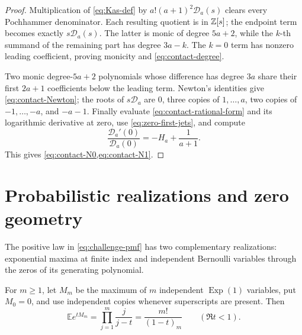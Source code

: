 \begin{proof}
Multiplication of \eqref{eq:Kas-def} by
\(a!(a+1)^2\mathscr D_a(s)\) clears every Pochhammer denominator.  Each
resulting quotient is in \(\mathbb Z[s]\); the endpoint term becomes exactly
\(s\mathscr D_a(s)\).  The latter is monic of degree \(5a+2\), while the
\(k\)-th summand of the remaining part has degree \(3a-k\).  The \(k=0\)
term has nonzero leading coefficient, proving monicity and
\eqref{eq:contact-degree}.

Two monic degree-\(5a+2\) polynomials whose difference has degree \(3a\)
share their first \(2a+1\) coefficients below the leading term.  Newton's
identities give \eqref{eq:contact-Newton}; the roots of
\(s\mathscr D_a\) are \(0\), three copies of \(1,\ldots,a\), two copies of
\(-1,\ldots,-a\), and \(-a-1\).  Finally evaluate
\eqref{eq:contact-rational-form} and its logarithmic derivative at zero,
use \eqref{eq:zero-first-jets}, and compute
\[
 \frac{\mathscr D_a'(0)}{\mathscr D_a(0)}
 =-H_a+\frac1{a+1}.
\]
This gives \cref{eq:contact-N0,eq:contact-N1}.
\end{proof}

\section{Probabilistic realizations and zero geometry}
\label{sec:ram-probability}

The positive law in \eqref{eq:challenge-pmf} has two complementary
realizations: exponential maxima at finite index and independent Bernoulli
variables through the zeros of its generating polynomial.

For \(m\ge1\), let \(M_m\) be the maximum of \(m\) independent
\(\operatorname{Exp}(1)\) variables, put \(M_0=0\), and use independent
copies whenever superscripts are present.  Then
\begin{equation}\label{eq:maxima-mgf}
 \mathbb Ee^{tM_m}=\prod_{j=1}^m\frac j{j-t}
 =\frac{m!}{(1-t)_m}\qquad(\Re t<1).
\end{equation}

